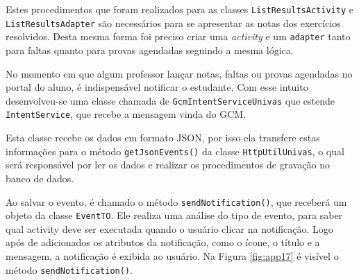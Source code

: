 	\par Estes procedimentos que foram realizados para as classes
\texttt{ListResultsActivity} e \texttt{ListResultsAdapter} são necessários
para se apresentar as notas dos exercícios resolvidos. Desta mesma forma foi
preciso criar uma \textit{activity} e um \texttt{adapter} tanto para faltas
quanto para provas agendadas seguindo a mesma lógica.

	\par No momento em que algum professor lançar notas, faltas ou provas agendadas
no portal do aluno, é indispensável notificar o estudante. Com esse intuito
desenvolveu-se uma classe chamada de \texttt{GcmIntentServiceUnivas} que
estende \texttt{IntentService}, que recebe a mensagem vinda do GCM.

	\par Esta classe recebe os dados em formato JSON, por isso ela transfere estas
informações para o método \texttt{getJsonEvents()} da classe
\texttt{HttpUtilUnivas}, o qual será responsável por ler os dados e realizar os
procedimentos de gravação no banco de dados.

	\par Ao salvar o evento, é chamado o método \texttt{sendNotification()}, que
receberá um objeto da classe \texttt{EventTO}. Ele realiza uma análise do tipo
de evento, para saber qual activity deve ser executada quando o usuário clicar
na notificação. Logo após de adicionados  os atributos da notificação, como o
ícone, o título e a mensagem, a notificação é exibida ao usuário. Na Figura
\ref{fig:app17} é visível o método \texttt{sendNotification()}.

